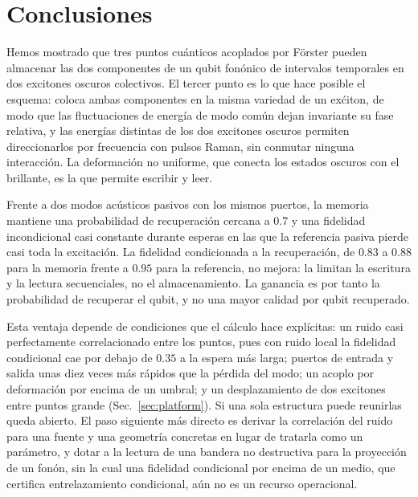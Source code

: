 \documentclass[aps,pra,twocolumn,groupedaddress,amsmath,amssymb,floatfix]{revtex4-2}
\begin{document}
\section{Conclusiones}
\label{sec:conclusions}
Hemos mostrado que tres puntos cu\'anticos acoplados por F\"orster pueden almacenar las dos componentes de un qubit fon\'onico de intervalos temporales en dos excitones oscuros colectivos. El tercer punto es lo que hace posible el esquema: coloca ambas componentes en la misma variedad de un ex\'citon, de modo que las fluctuaciones de energ\'ia de modo com\'un dejan invariante su fase relativa, y las energ\'ias distintas de los dos excitones oscuros permiten direccionarlos por frecuencia con pulsos Raman, sin conmutar ninguna interacci\'on. La deformaci\'on no uniforme, que conecta los estados oscuros con el brillante, es la que permite escribir y leer.

Frente a dos modos ac\'usticos pasivos con los mismos puertos, la memoria mantiene una probabilidad de recuperaci\'on cercana a $0.7$ y una fidelidad incondicional casi constante durante esperas en las que la referencia pasiva pierde casi toda la excitaci\'on. La fidelidad condicionada a la recuperaci\'on, de $0.83$ a $0.88$ para la memoria frente a $0.95$ para la referencia, no mejora: la limitan la escritura y la lectura secuenciales, no el almacenamiento. La ganancia es por tanto la probabilidad de recuperar el qubit, y no una mayor calidad por qubit recuperado.

Esta ventaja depende de condiciones que el c\'alculo hace expl\'icitas: un ruido casi perfectamente correlacionado entre los puntos, pues con ruido local la fidelidad condicional cae por debajo de $0.35$ a la espera m\'as larga; puertos de entrada y salida unas diez veces m\'as r\'apidos que la p\'erdida del modo; un acoplo por deformaci\'on por encima de un umbral; y un desplazamiento de dos excitones entre puntos grande (Sec.~\ref{sec:platform}). Si una sola estructura puede reunirlas queda abierto. El paso siguiente m\'as directo es derivar la correlaci\'on del ruido para una fuente y una geometr\'ia concretas en lugar de tratarla como un par\'ametro, y dotar a la lectura de una bandera no destructiva para la proyecci\'on de un fon\'on, sin la cual una fidelidad condicional por encima de un medio, que certifica entrelazamiento condicional, a\'un no es un recurso operacional.

\end{document}

